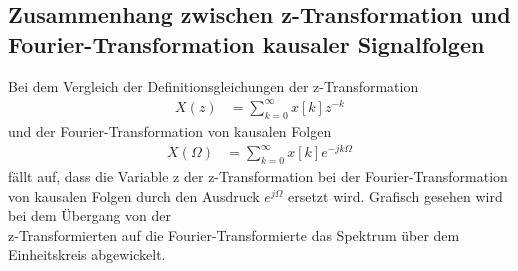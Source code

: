 \subsection{Zusammenhang zwischen z-Transformation und Fourier-Transformation kausaler Signalfolgen}\label{sec:7.3.2}

Bei dem Vergleich der Definitionsgleichungen der z-Transformation
\begin{align}
X(z) &= \sum\limits_{k = 0}^{\infty}{x[ k]  z^{- k}} \label{eq:7.104}
\end{align}
und der Fourier-Transformation von kausalen Folgen
\begin{align}
X(\Omega) &= \sum\limits_{k = 0}^{\infty}{x[ k]  e^{- j  k  \Omega}} \label{eq:7.105}
\end{align}
fällt auf, dass die Variable z der z-Transformation bei der Fourier-Transformation von kausalen Folgen durch den Ausdruck \(e^{jΩ}\) ersetzt wird. Grafisch gesehen wird bei dem Übergang von der\\
z-Transformierten auf die Fourier-Transformierte das Spektrum über dem Einheitskreis abgewickelt.

